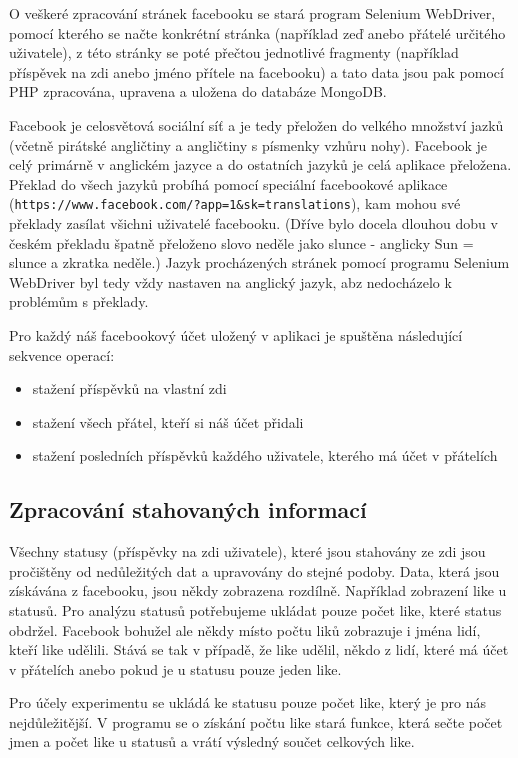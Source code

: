 \documentclass[thesis=M,czech]{FITthesis}[2013/05/10]
\begin{document}
O veškeré zpracování stránek facebooku se stará program Selenium WebDriver, pomocí kterého se načte konkrétní stránka (například zeď anebo přátelé určitého uživatele), z této stránky se poté přečtou jednotlivé fragmenty (například příspěvek na zdi anebo jméno přítele na facebooku) a tato data jsou pak pomocí PHP zpracována, upravena a uložena do databáze MongoDB. 

Facebook je celosvětová sociální síť a je tedy přeložen do velkého množství jazků (včetně pirátské angličtiny a angličtiny s písmenky vzhůru nohy). Facebook je celý primárně v anglickém jazyce a do ostatních jazyků je celá aplikace přeložena. Překlad do všech jazyků probíhá pomocí speciální facebookové aplikace (\verb|https://www.facebook.com/?app=1&sk=translations|), kam mohou své překlady zasílat všichni uživatelé facebooku. (Dříve bylo docela dlouhou dobu v českém překladu špatně přeloženo slovo neděle jako slunce - anglicky Sun = slunce a zkratka neděle.) Jazyk procházených stránek pomocí programu Selenium WebDriver byl tedy vždy nastaven na anglický jazyk, abz nedocházelo k problémům s překlady. 

Pro každý náš facebookový účet uložený v aplikaci je spuštěna následující sekvence operací:

\begin{itemize}
  \item stažení příspěvků na vlastní zdi
  \item stažení všech přátel, kteří si náš účet přidali
  \item stažení posledních příspěvků každého uživatele, kterého má účet v přátelích
\end{itemize}

\subsection{Zpracování stahovaných informací}

Všechny statusy (příspěvky na zdi uživatele), které jsou stahovány ze zdi jsou pročištěny od nedůležitých dat a upravovány do stejné podoby. Data, která jsou získávána z facebooku, jsou někdy zobrazena rozdílně. Například zobrazení like u statusů. Pro analýzu statusů potřebujeme ukládat pouze počet like, které status obdržel. Facebook bohužel ale někdy místo počtu liků zobrazuje i jména lidí, kteří like udělili. Stává se tak v případě, že like udělil, někdo z lidí, které má účet v přátelích anebo pokud je u statusu pouze jeden like.

Pro účely experimentu se ukládá ke statusu pouze počet like, který je pro nás nejdůležitější. V programu se o získání počtu like stará funkce, která sečte počet jmen a počet like u statusů a vrátí výsledný součet celkových like. 
\end{document}
